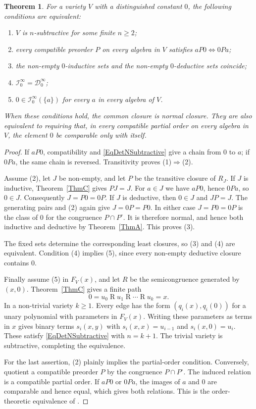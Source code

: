 \documentclass[12pt,english]{amsart}
\newtheorem{theorem}{Theorem}[section]
\theoremstyle{definition}
\numberwithin{equation}{section}
\theoremstyle{remark}
\begin{document}
\begin{theorem}\label{ThmDetEventualSubtractivity}
For a variety $V$ with a distinguished constant $0$, the following
conditions are equivalent:
\begin{enumerate}
\item $V$ is $n$-subtractive for some finite $n\geqslant2$;
\item every compatible preorder $P$ on every algebra in $V$ satisfies
      $aP0\Longleftrightarrow0Pa$;
\item the non-empty $0$-inductive sets and the non-empty
      $0$-deductive sets coincide;
\item $\mathcal I_0^\infty=\mathcal D_0^\infty$;
\item $0\in\mathcal I_0^\infty(\{a\})$ for every $a$ in every
      algebra of $V$.
\end{enumerate}
When these conditions hold, the common closure is normal closure.
They are also equivalent to requiring that, in every compatible
partial order on every algebra in $V$, the element $0$ be comparable
only with itself.
\end{theorem}

\begin{proof}
If $aP0$, compatibility and \eqref{EqDetNSubtractive} give a chain
from $0$ to $a$; if $0Pa$, the same chain is reversed. Transitivity
proves (1)$\Rightarrow$(2).

Assume (2), let $J$ be non-empty, and let $P$ be the transitive
closure of $R_J$. If $J$ is inductive, Theorem~\ref{ThmC} gives
$PJ=J$. For $a\in J$ we have $aP0$, hence $0Pa$, so $0\in J$.
Consequently $J=P0=0P$. If $J$ is deductive, then $0\in J$ and
$JP=J$. The generating pairs and (2) again give $J=0P=P0$.
In either case $J=P0=0P$ is the class of $0$ for the congruence
$P\cap P^\circ$. It is therefore normal, and hence both inductive
and deductive by Theorem~\ref{ThmA}. This proves (3).

The fixed sets determine the corresponding least closures, so (3)
and (4) are equivalent. Condition (4) implies (5), since every
non-empty deductive closure contains $0$.

Finally assume (5) in $F_V(x)$, and let $R$ be the semicongruence
generated by $(x,0)$. Theorem~\ref{ThmC} gives a finite path
\[
0=u_0\mathrel R u_1\mathrel R\cdots\mathrel R u_k=x.
\]
In a non-trivial variety $k\geqslant1$. Every edge has the form
$(q_i(x),q_i(0))$ for a unary polynomial with parameters in $F_V(x)$.
Writing these parameters as terms in $x$ gives binary terms
$s_i(x,y)$ with $s_i(x,x)=u_{i-1}$ and $s_i(x,0)=u_i$.
These satisfy \eqref{EqDetNSubtractive} with $n=k+1$.
The trivial variety is subtractive, completing the equivalence.

For the last assertion, (2) plainly implies the partial-order
condition. Conversely, quotient a compatible preorder $P$ by the
congruence $P\cap P^\circ$. The induced relation is a compatible
partial order. If $aP0$ or $0Pa$, the images of $a$ and $0$ are
comparable and hence equal, which gives both relations.
This is the order-theoretic equivalence of
\cite[Theorem 5.9]{DetCS13}.
\end{proof}
\end{document}
